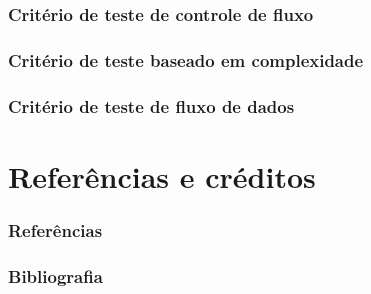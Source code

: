 \documentclass[utf8, usepdftitle=false, svgnames, color={table,
fixpdftex, hyperref, fixinclude, xcdraw}, t, brazil]{beamer}
\begin{document}
 \section{Critério de teste de controle de fluxo}
  
 
 \section{Critério de teste baseado em complexidade}
  

 \section{Critério de teste de fluxo de dados}
   
 
 \part{Referências e créditos}
 
 \section{Referências}
 
 
 \section{Bibliografia}
 
 
%  
\end{document}
